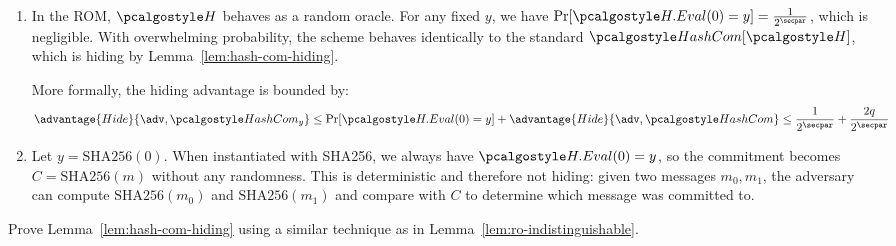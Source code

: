 \ifsolutions
\begin{mysolution}
  \begin{enumerate}
    \item In the ROM, $\algo{H}$ behaves as a random oracle. For any fixed $y$, we have $\Pr[\algo{H.Eval}(0) = y] = \frac{1}{2^\secpar}$, which is negligible. With overwhelming probability, the scheme behaves identically to the standard $\algo{HashCom}[\algo{H}]$, which is hiding by Lemma~\ref{lem:hash-com-hiding}.
    
    More formally, the hiding advantage is bounded by:
    \[
    \advantage{Hide}{\adv, \algo{HashCom}_y} \leq \Pr[\algo{H.Eval}(0) = y] + \advantage{Hide}{\adv, \algo{HashCom}} \leq \frac{1}{2^\secpar} + \frac{2q}{2^\secpar}
    \]
    
    \item Let $y = \text{SHA256}(0)$. When instantiated with SHA256, we always have $\algo{H.Eval}(0) = y$, so the commitment becomes $C = \text{SHA256}(m)$ without any randomness. This is deterministic and therefore not hiding: given two messages $m_0, m_1$, the adversary can compute $\text{SHA256}(m_0)$ and $\text{SHA256}(m_1)$ and compare with $C$ to determine which message was committed to.
  \end{enumerate}
\end{mysolution}
\fi

\begin{exercise}
  Prove Lemma~\ref{lem:hash-com-hiding} using a similar technique as in Lemma~\ref{lem:ro-indistinguishable}.
\end{exercise}

